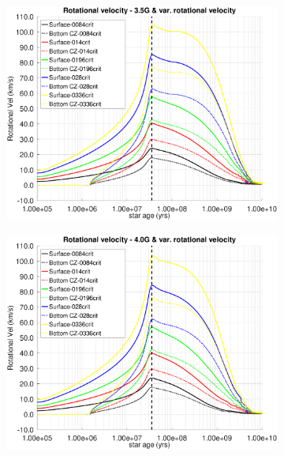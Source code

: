 \documentclass[fleqn,usenatbib]{mnras}
\begin{document}
\begin{figure}
\begin{subfigure}[h]{0.47\textwidth}
    \includegraphics[trim = 10mm 10mm 15mm 10mm, clip,width=\textwidth]{figures/rot_vel_var_vel_3_5g.eps}
    \label{fig:subim43}
    \end{subfigure}
    \begin{subfigure}[h]{0.47\textwidth}
    \includegraphics[trim = 10mm 10mm 15mm 10mm, clip,width=\textwidth]{figures/rot_vel_var_vel_4_0g.eps}
    \label{fig:subim44}
    \end{subfigure}
    \begin{subfigure}[h]{0.47\textwidth}

\end{subfigure}
\end{figure}
\end{document}
